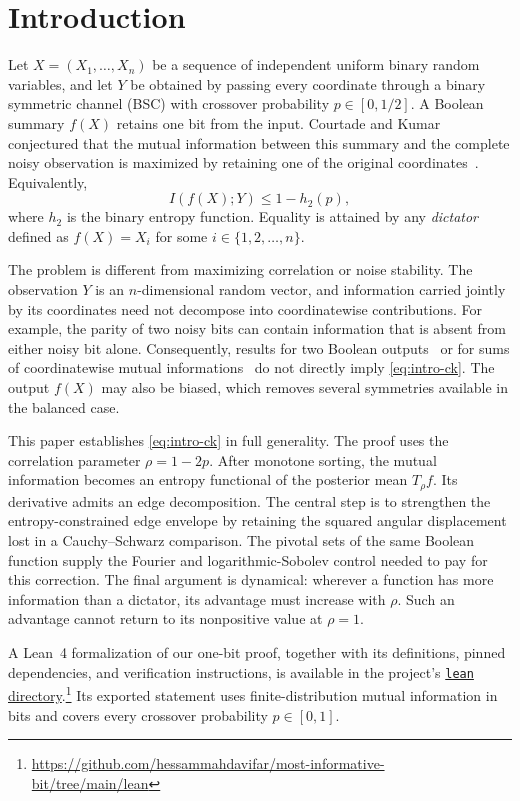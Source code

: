 \section{Introduction}
\label{sec:introduction}

Let \(X=(X_1,\ldots,X_n)\) be a sequence of independent uniform binary
random variables, and let \(Y\) be obtained by passing every coordinate
through a binary symmetric channel (BSC) with crossover probability
\(p\in[0,1/2]\). A Boolean summary \(f(X)\) retains one bit from the
input. Courtade and Kumar conjectured that the mutual information between
this summary and the complete noisy observation is maximized by retaining
one of the original coordinates~\cite{CK}. Equivalently,
\begin{equation}
 I(f(X);Y)\leq 1-h_2(p),
 \label{eq:intro-ck}
\end{equation}
where \(h_2\) is the binary entropy function. Equality is attained by any
\textit{dictator} defined as \(f(X)=X_i\) for some \(i \in \{1,2,\dots,n\}\).

The problem is different from maximizing correlation or noise
stability. The observation \(Y\) is an \(n\)-dimensional random vector,
and information carried jointly by its coordinates need not decompose
into coordinatewise contributions. For example, the parity of two noisy
bits can contain information that is absent from either noisy bit alone.
Consequently, results for two Boolean outputs~\cite{AGKN,PPM} or for sums
of coordinatewise mutual informations~\cite{JW} do not directly imply
\eqref{eq:intro-ck}. The output \(f(X)\) may also be biased, which removes
several symmetries available in the balanced case.

This paper establishes \eqref{eq:intro-ck} in full generality. The proof
uses the correlation parameter \(\rho=1-2p\). After monotone sorting, the
mutual information becomes an entropy functional of the posterior mean
\(T_\rho f\). Its derivative admits an edge decomposition. The central
step is to strengthen the entropy-constrained edge envelope by retaining
the squared angular displacement lost in a Cauchy--Schwarz comparison.
The pivotal sets of the same Boolean function supply the Fourier and
logarithmic-Sobolev control needed to pay for this correction. The final
argument is dynamical: wherever a function has more information than a
dictator, its advantage must increase with \(\rho\). Such an advantage
cannot return to its nonpositive value at \(\rho=1\).

A Lean~4 formalization of our one-bit proof, together with its
definitions, pinned dependencies, and verification instructions, is
available in the project's \href{https://github.com/hessammahdavifar/most-informative-bit/tree/main/lean}{\texttt{lean} directory}.\footnote{\url{https://github.com/hessammahdavifar/most-informative-bit/tree/main/lean}}
Its exported statement uses finite-distribution mutual information in
bits and covers every crossover probability \(p\in[0,1]\).

